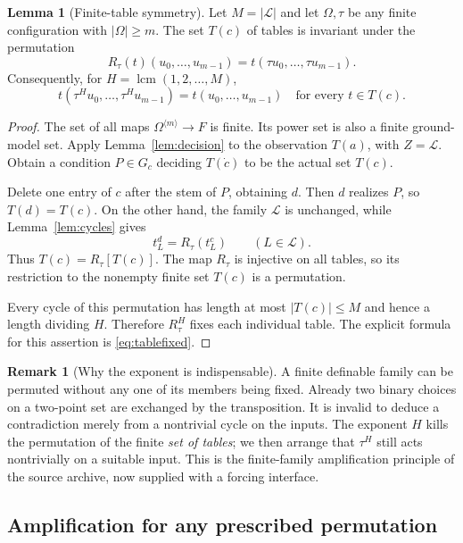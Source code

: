 \documentclass[11pt,letterpaper]{article}
\theoremstyle{definition}
\newtheorem{lemma}[definition]{Lemma}
\newtheorem{remark}[definition]{Remark}
\numberwithin{equation}{section}
\newcommand{\lcm}{\operatorname{lcm}}
\newcommand{\ttuple}[2]{{#1}^{\langle #2\rangle}}
\begin{document}
\begin{lemma}[Finite-table symmetry]\label{lem:table}
Let $M=|\mathscr L|$ and let $\Omega,\tau$ be any finite configuration with
$|\Omega|\ge m$. The set $T(c)$ of tables is invariant under the permutation
\[
 R_\tau(t)(u_0,\ldots,u_{m-1})
                  =t(\tau u_0,\ldots,\tau u_{m-1}).
\]
Consequently, for $H=\lcm(1,2,\ldots,M)$,
\begin{equation}\label{eq:tablefixed}
 t(\tau^H u_0,\ldots,\tau^H u_{m-1})=t(u_0,\ldots,u_{m-1})
 \quad\text{for every }t\in T(c).
\end{equation}
\end{lemma}

\begin{proof}
The set of all maps $\ttuple{\Omega}{m}\to F$ is finite. Its power set is
also a finite ground-model set. Apply Lemma~\ref{lem:decision} to the
observation $T(a)$, with $Z=\mathscr L$. Obtain a condition $P\in G_c$
deciding $T(\dot c)$ to be the actual set $T(c)$.

Delete one entry of $c$ after the stem of $P$, obtaining $d$. Then $d$
realizes $P$, so $T(d)=T(c)$. On the other hand, the family $\mathscr L$ is
unchanged, while Lemma~\ref{lem:cycles} gives
\[
                          t_L^d=R_\tau(t_L^c)
                          \qquad(L\in\mathscr L).
\]
Thus $T(c)=R_\tau[T(c)]$. The map $R_\tau$ is injective on all tables, so its
restriction to the nonempty finite set $T(c)$ is a permutation.

Every cycle of this permutation has length at most $|T(c)|\le M$ and hence
a length dividing $H$. Therefore $R_\tau^H$ fixes each individual table.
The explicit formula for this assertion is \eqref{eq:tablefixed}.
\end{proof}

\begin{remark}[Why the exponent is indispensable]
A finite definable family can be permuted without any one of its members
being fixed. Already two binary choices on a two-point set are exchanged by
the transposition. It is invalid to deduce a contradiction merely from a
nontrivial cycle on the inputs. The exponent $H$ kills the permutation of
the finite \emph{set of tables}; we then arrange that $\tau^H$ still acts
nontrivially on a suitable input. This is the finite-family amplification
principle of the source archive, now supplied with a forcing interface.
\end{remark}

\subsection{Amplification for any prescribed permutation}
\end{document}
